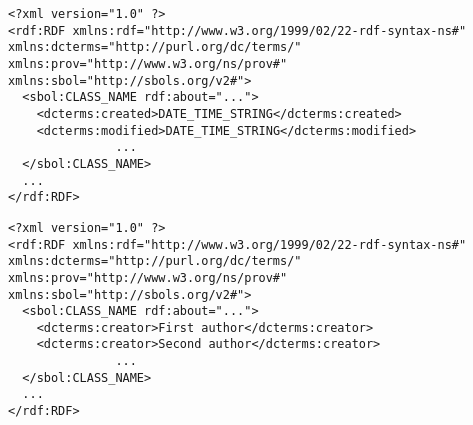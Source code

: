\begin{lstlisting}
<?xml version="1.0" ?>
<rdf:RDF xmlns:rdf="http://www.w3.org/1999/02/22-rdf-syntax-ns#" xmlns:dcterms="http://purl.org/dc/terms/" xmlns:prov="http://www.w3.org/ns/prov#" xmlns:sbol="http://sbols.org/v2#">
  <sbol:CLASS_NAME rdf:about="...">
    <dcterms:created>DATE_TIME_STRING</dcterms:created>
    <dcterms:modified>DATE_TIME_STRING</dcterms:modified>
               ...
  </sbol:CLASS_NAME>
  ...
</rdf:RDF>
\end{lstlisting}

\begin{lstlisting}
<?xml version="1.0" ?>
<rdf:RDF xmlns:rdf="http://www.w3.org/1999/02/22-rdf-syntax-ns#" xmlns:dcterms="http://purl.org/dc/terms/" xmlns:prov="http://www.w3.org/ns/prov#" xmlns:sbol="http://sbols.org/v2#">
  <sbol:CLASS_NAME rdf:about="...">
    <dcterms:creator>First author</dcterms:creator>
    <dcterms:creator>Second author</dcterms:creator>
               ...
  </sbol:CLASS_NAME>
  ...
</rdf:RDF>
\end{lstlisting}

